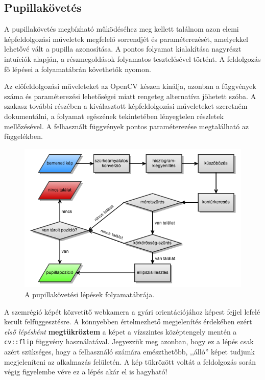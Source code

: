 \subsection{Pupillakövetés}\label{sect:pupillakov}

A pupillakövetés megbízható működéséhez meg kellett találnom azon elemi képfeldolgozási műveletek megfelelő sorrendjét és paraméterezését, amelyekkel lehetővé vált a pupilla azonosítása. A pontos folyamat kialakítása nagyrészt intuíciók alapján, a részmegoldások folyamatos tesztelésével történt. A feldolgozás fő lépései a  folyamatábrán követhetők nyomon.

Az előfeldolgozási műveleteket az OpenCV készen kínálja, azonban a függvények száma és paraméterezési lehetőségei miatt rengeteg alternatíva jöhetett szóba. A szakasz további részében a kiválasztott képfeldolgozási műveleteket szeretném dokumentálni, a folyamat egészének tekintetében lényegtelen részletek mellőzésével. A felhasznált függvények pontos paraméterezése megtalálható az  függelékben. 

\begin{figure}[!ht]
\centering
\includegraphics[width=140mm, keepaspectratio]{figures/folyamat.png}
\caption{A pupillakövetési lépések folyamatábrája.}
\label{fig:folyamat}
\end{figure}

A szemrégió képét közvetítő webkamera a gyári orientációjához képest fejjel lefelé került felfüggesztésre. A könnyebben értelmezhető megjelenítés érdekében ezért \emph{első lépésként} \textbf{megtükröztem} a képet a vízszintes középtengely mentén a \texttt{cv::flip} függvény használatával. Jegyezzük meg azonban, hogy ez a lépés csak azért szükséges, hogy a felhasználó számára emészthetőbb, ,,álló'' képet tudjunk megjeleníteni az alkalmazás felületén. A kép tükrözött voltát a feldolgozás során végig figyelembe véve ez a lépés akár el is hagyható!

